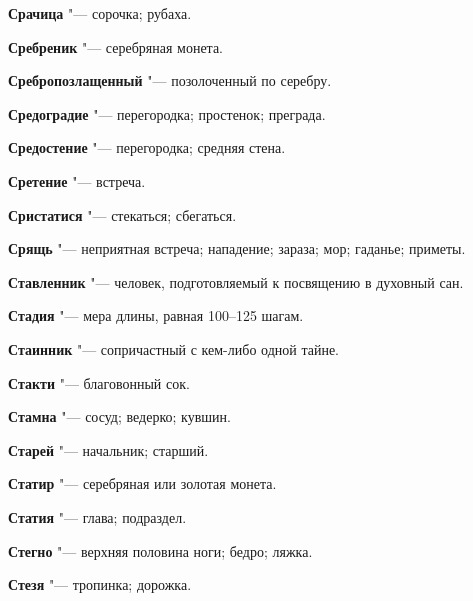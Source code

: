 \begin{mymulticols}{2}
\noindent\textbf{Срачица} "--- сорочка; рубаха. 




\noindent\textbf{Сребреник} "--- серебряная монета. 




\noindent\textbf{Сребропозлащенный} "--- позолоченный по серебру. 




\noindent\textbf{Средоградие} "--- перегородка; простенок; преграда. 




\noindent\textbf{Средостение} "--- перегородка; средняя стена. 




\noindent\textbf{Сретение} "--- встреча. 




\noindent\textbf{Сристатися} "--- стекаться; сбегаться. 




\noindent\textbf{Срящь} "--- неприятная встреча; нападение; зараза; мор; гаданье; приметы. 




\noindent\textbf{Ставленник} "--- человек, подготовляемый к посвящению в духовный сан. 




\noindent\textbf{Стадия} "--- мера длины, равная 100--125 шагам. 




\noindent\textbf{Стаинник} "--- сопричастный с кем-либо одной тайне. 




\noindent\textbf{Стакти} "--- благовонный сок. 




\noindent\textbf{Стамна} "--- сосуд; ведерко; кувшин. 




\noindent\textbf{Старей} "--- начальник; старший. 




\noindent\textbf{Статир} "--- серебряная или золотая монета. 




\noindent\textbf{Статия} "--- глава; подраздел. 




\noindent\textbf{Стегно} "--- верхняя половина ноги; бедро; ляжка. 




\noindent\textbf{Стезя} "--- тропинка; дорожка. 





\end{mymulticols}
